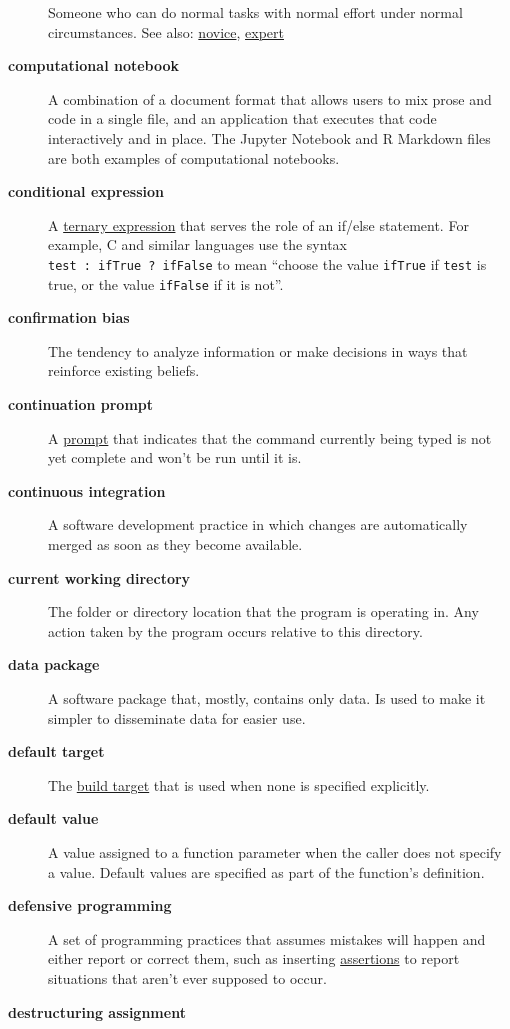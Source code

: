 \documentclass[
]{krantz}
\begin{document}
\begin{description}
Someone who can do normal tasks with normal effort under normal circumstances. See also: \protect\hyperlink{novice}{novice}, \protect\hyperlink{expert}{expert}
\item[\textbf{computational notebook}]
A combination of a document format that allows users to mix prose and code in a single file, and an application that executes that code interactively and in place. The Jupyter Notebook and R Markdown files are both examples of computational notebooks.
\item[\textbf{conditional expression}]
A \protect\hyperlink{ternary_expression}{ternary expression} that serves the role of an if/else statement. For example, C and similar languages use the syntax \texttt{test\ :\ ifTrue\ ?\ ifFalse} to mean ``choose the value \texttt{ifTrue} if \texttt{test} is true, or the value \texttt{ifFalse} if it is not''.
\item[\textbf{confirmation bias}]
The tendency to analyze information or make decisions in ways that reinforce existing beliefs.
\item[\textbf{continuation prompt}]
A \protect\hyperlink{prompt}{prompt} that indicates that the command currently being typed is not yet complete and won't be run until it is.
\item[\textbf{continuous integration}]
A software development practice in which changes are automatically merged as soon as they become available.
\item[\textbf{current working directory}]
The folder or directory location that the program is operating in. Any action taken by the program occurs relative to this directory.
\item[\textbf{data package}]
A software package that, mostly, contains only data. Is used to make it simpler to disseminate data for easier use.
\item[\textbf{default target}]
The \protect\hyperlink{build_target}{build target} that is used when none is specified explicitly.
\item[\textbf{default value}]
A value assigned to a function parameter when the caller does not specify a value. Default values are specified as part of the function's definition.
\item[\textbf{defensive programming}]
A set of programming practices that assumes mistakes will happen and either report or correct them, such as inserting \protect\hyperlink{assertion}{assertions} to report situations that aren't ever supposed to occur.
\item[\textbf{destructuring assignment}]

\end{description}
\end{document}
